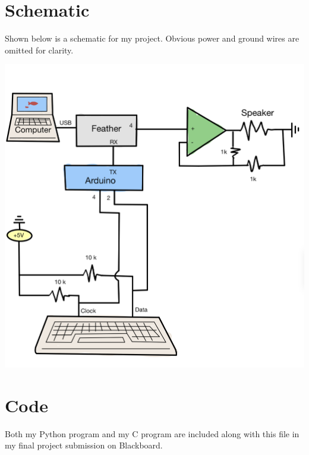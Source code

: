 \documentclass[12pt]{article}
\begin{document}
\newpage\section*{Schematic}

    Shown below is a schematic for my project.
    Obvious power and ground wires are omitted for clarity.

    \begin{center}\includegraphics[scale=.2]{schematic.jpg}\end{center}

\section*{Code}

    Both my Python program and my C program are included along with this file in my final project submission on Blackboard.
\end{document}
